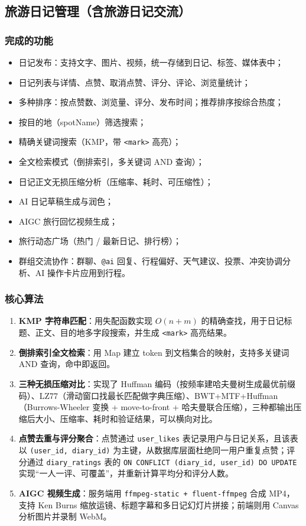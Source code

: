\documentclass[UTF8,a4paper,12pt]{ctexart}
\begin{document}
\subsection{旅游日记管理（含旅游日记交流）}

\subsubsection{完成的功能}
\begin{itemize}
\item 日记发布：支持文字、图片、视频，统一存储到日记、标签、媒体表中；
\item 日记列表与详情、点赞、取消点赞、评分、评论、浏览量统计；
\item 多种排序：按点赞数、浏览量、评分、发布时间；推荐排序按综合热度；
\item 按目的地（spotName）筛选搜索；
\item 精确关键词搜索（KMP，带 \texttt{<mark>} 高亮）；
\item 全文检索模式（倒排索引，多关键词 AND 查询）；
\item 日记正文无损压缩分析（压缩率、耗时、可压缩性）；
\item AI 日记草稿生成与润色；
\item AIGC 旅行回忆视频生成；
\item 旅行动态广场（热门 / 最新日记、排行榜）；
\item 群组交流协作：群聊、\texttt{@ai} 回复、行程偏好、天气建议、投票、冲突协调分析、AI 操作卡片应用到行程。
\end{itemize}

\subsubsection{核心算法}
\begin{enumerate}
\item \textbf{KMP 字符串匹配}：用失配函数实现 $O(n+m)$ 的精确查找，用于日记标题、正文、目的地多字段搜索，并生成 \texttt{<mark>} 高亮结果。
\item \textbf{倒排索引全文检索}：用 Map 建立 token 到文档集合的映射，支持多关键词 AND 查询，命中即返回。
\item \textbf{三种无损压缩对比}：实现了 Huffman 编码（按频率建哈夫曼树生成最优前缀码）、LZ77（滑动窗口找最长匹配做字典压缩）、BWT+MTF+Huffman（Burrows-Wheeler 变换 + move-to-front + 哈夫曼联合压缩），三种都输出压缩后大小、压缩率、耗时和验证结果，可以横向对比。
\item \textbf{点赞去重与评分聚合}：点赞通过 \texttt{user\_likes} 表记录用户与日记关系，且该表以 \texttt{(user\_id, diary\_id)} 为主键，从数据库层面杜绝同一用户重复点赞；评分通过 \texttt{diary\_ratings} 表的 \texttt{ON CONFLICT (diary\_id, user\_id) DO UPDATE} 实现“一人一评、可覆盖”，并重新计算平均分和评分人数。
\item \textbf{AIGC 视频生成}：服务端用 \texttt{ffmpeg-static + fluent-ffmpeg} 合成 MP4，支持 Ken Burns 缩放运镜、标题字幕和多日记幻灯片拼接；前端则用 Canvas 分析图片并录制 WebM。
\end{enumerate}
\end{document}

